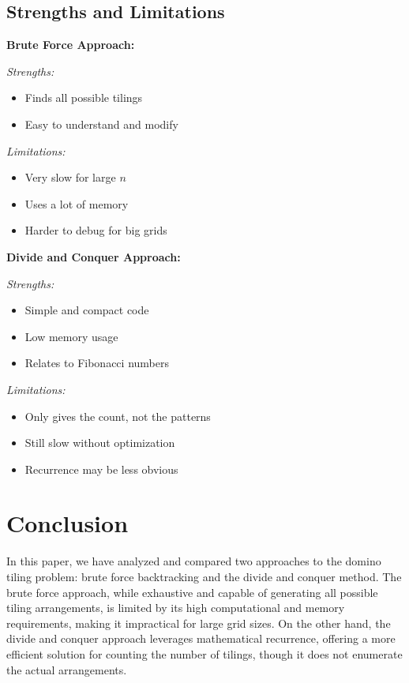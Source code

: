 \documentclass[conference]{IEEEtran}
\begin{document}
\subsection{Strengths and Limitations}

\textbf{Brute Force Approach:}

\textit{Strengths:}
\begin{itemize}
    \item Finds all possible tilings
    \item Easy to understand and modify
\end{itemize}

\textit{Limitations:}
\begin{itemize}
    \item Very slow for large $n$
    \item Uses a lot of memory
    \item Harder to debug for big grids
\end{itemize}

\textbf{Divide and Conquer Approach:}

\textit{Strengths:}
\begin{itemize}
    \item Simple and compact code
    \item Low memory usage
    \item Relates to Fibonacci numbers
\end{itemize}

\textit{Limitations:}
\begin{itemize}
    \item Only gives the count, not the patterns
    \item Still slow without optimization
    \item Recurrence may be less obvious
\end{itemize}

\section{Conclusion}

In this paper, we have analyzed and compared two approaches to the domino tiling problem: brute force backtracking and the divide and conquer method. The brute force approach, while exhaustive and capable of generating all possible tiling arrangements, is limited by its high computational and memory requirements, making it impractical for large grid sizes. On the other hand, the divide and conquer approach leverages mathematical recurrence, offering a more efficient solution for counting the number of tilings, though it does not enumerate the actual arrangements.
\end{document}
